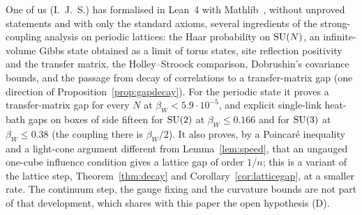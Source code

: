 One of us (I.~J.~S.) has formalised in Lean~4 with Mathlib~\cite{Ses26}, without
unproved statements and with only the standard axioms, several ingredients of
the strong-coupling analysis on periodic lattices: the Haar probability on
$\mathrm{SU}(N)$, an infinite-volume Gibbs state obtained as a limit of torus states,
site reflection positivity and the transfer matrix, the Holley--Stroock
comparison, Dobrushin's covariance bounds, and the passage from decay of
correlations to a transfer-matrix gap (one direction of
Proposition~\ref{prop:gapdecay}). For the periodic state it proves a
transfer-matrix gap for every $N$ at $\beta_W<5.9\cdot10^{-5}$, and explicit
single-link heat-bath gaps on boxes of side fifteen for $\mathrm{SU}(2)$ at
$\beta_W\le0.166$ and for $\mathrm{SU}(3)$ at $\beta_W\le0.38$ (the coupling there is
$\beta_W/2$). It also proves, by a Poincar\'e inequality and a light-cone
argument different from Lemma~\ref{lem:speed}, that an ungauged one-cube
influence condition gives a lattice gap of order $1/n$; this is a variant of
the lattice step, Theorem~\ref{thm:decay} and Corollary~\ref{cor:latticegap},
at a smaller rate. The continuum step, the gauge
fixing and the curvature bounds are not part of that development, which shares
with this paper the open hypothesis (D).

